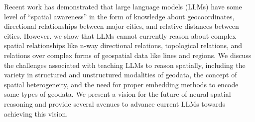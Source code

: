 
Recent work has demonstrated that large language models (LLMs) have some level of ``spatial awareness'' in the form of knowledge about geocoordinates, directional relationships between major cities, and relative distances between cities.
However. we show that LLMs cannot currently reason about complex spatial relationships like n-way directional relations, topological relations, and relations over complex forms of geospatial data like lines and regions.
%
We discuss the challenges associated with teaching LLMs to reason spatially, including the variety in structured and unstructured modalities of geodata, the concept of spatial heterogeneity, and the need for proper embedding methods to encode some types of geodata.
%
We present a vision for the future of neural spatial reasoning and provide several avenues to advance current LLMs towards achieving this vision.